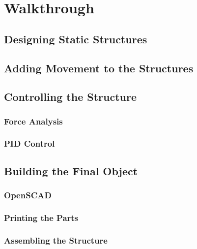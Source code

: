 \chapter{Walkthrough}\label{ch:walkthrough}
\section{Designing Static Structures}
\clearpage
\section{Adding Movement to the Structures}
\clearpage
\section{Controlling the Structure}
\subsection{Force Analysis}
\subsection{PID Control}
\clearpage
\section{Building the Final Object}
\subsection{OpenSCAD}
\subsection{Printing the Parts}
\subsection{Assembling the Structure}
